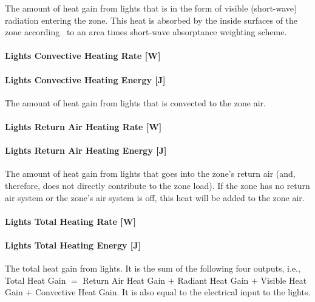 The amount of heat gain from lights that is in the form of visible (short-wave) radiation entering the zone. This heat is absorbed by the inside surfaces of the zone according~ to an area times short-wave absorptance weighting scheme.

\paragraph{Lights Convective Heating Rate {[}W{]}}\label{lights-convective-heating-rate-w}

\paragraph{Lights Convective Heating Energy {[}J{]}}\label{lights-convective-heating-energy-j}

The amount of heat gain from lights that is convected to the zone air.

\paragraph{Lights Return Air Heating Rate {[}W{]}}\label{lights-return-air-heating-rate-w}

\paragraph{Lights Return Air Heating Energy {[}J{]}}\label{lights-return-air-heating-energy-j}

The amount of heat gain from lights that goes into the zone's return air (and, therefore, does not directly contribute to the zone load). If the zone has no return air system or the zone's air system is off, this heat will be added to the zone air.

\paragraph{Lights Total Heating Rate {[}W{]}}\label{lights-total-heating-rate-w}

\paragraph{Lights Total Heating Energy {[}J{]}}\label{lights-total-heating-energy-j}

The total heat gain from lights. It is the sum of the following four outputs, i.e., Total Heat Gain $=$ Return Air Heat Gain $+$ Radiant Heat Gain $+$ Visible Heat Gain $+$ Convective Heat Gain. It is also equal to the electrical input to the lights.


